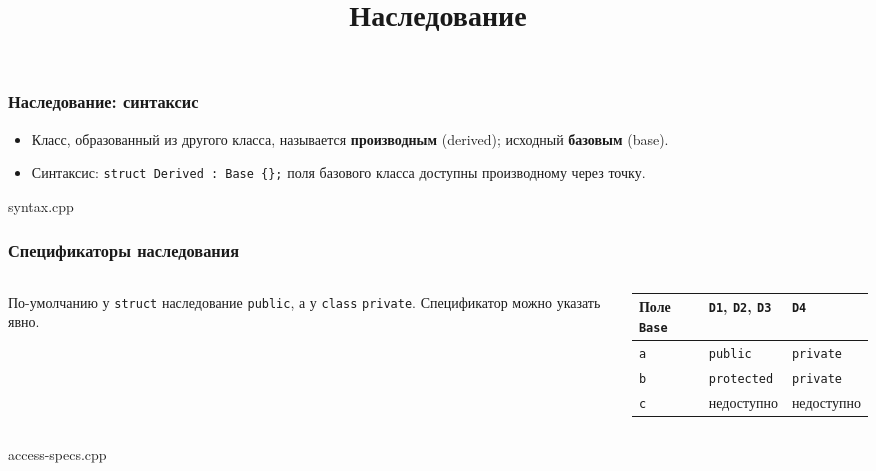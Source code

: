 \documentclass[compress, 8pt, aspectratio=169]{beamer}
\title{Наследование}
\begin{document}
  \frame[plain]{\titlepage}

  \begin{frame}[fragile]

    \frametitle{Наследование: синтаксис}

    \begin{itemize}
      \item Класс, образованный из другого класса, называется
        \textbf{производным} (derived); исходный \textemdash \space
        \textbf{базовым} (base).
      \item Синтаксис: \texttt{struct Derived : Base \{\};} \textemdash \space
        поля базового класса доступны производному через точку.
    \end{itemize}

        {syntax.cpp}

  \end{frame}

  \begin{frame}[fragile]

    \frametitle{Спецификаторы наследования}

    \begin{columns}[T]

      \begin{column}{0.38\textwidth}

        По-умолчанию у \texttt{struct} наследование \texttt{public}, а
        у \texttt{class} \textemdash \space \texttt{private}.
        Спецификатор можно указать явно.

      \end{column}

      \begin{column}{0.58\textwidth}

      \begin{tabular}{lll}
        \hline
        Поле \texttt{Base}
          & \texttt{D1}, \texttt{D2}, \texttt{D3}
          & \texttt{D4} \\
        \hline
        \texttt{a} & \texttt{public} & \texttt{private} \\
        \texttt{b} & \texttt{protected} & \texttt{private} \\
        \texttt{c} & недоступно & недоступно \\
        \hline
      \end{tabular}

      \end{column}

    \end{columns}

        {access-specs.cpp}

  \end{frame}
\end{document}
